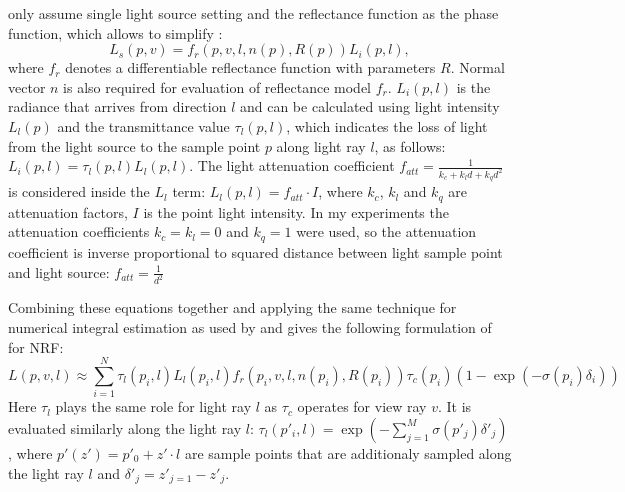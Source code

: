 \cite{bi2020neural} only assume single light source setting
and the reflectance function as the phase function,
which allows to simplify :
\begin{equation}
    L_s(p, v) = f_r(p, v, l, n(p), R(p)) L_i(p, l),
\end{equation}
where $f_r$ denotes a differentiable reflectance function
with parameters $R$.
Normal vector $n$ is also required for evaluation of reflectance model $f_r$.
$L_i(p, l)$ is the radiance that arrives from direction $l$ and can be calculated using light intensity $L_l(p)$
and the transmittance value $\tau_l(p, l)$,
which indicates the loss of light from the light source to the sample point $p$ along light ray $l$, as follows:
$L_i(p, l) = \tau_l(p, l) L_l(p, l)$.
The light attenuation coefficient $f_{att} = \frac{1}{k_c + k_l d + k_q d^2}$ \cite{madams2011attenuation, madams2011improved} is considered inside the $L_l$ term:
$L_l(p, l) = f_{att} \cdot I$,
where $k_c$, $k_l$ and $k_q$ are attenuation factors,
$I$ is the point light intensity.
In my experiments the attenuation coefficients $k_c = k_l = 0$ and $k_q = 1$ were used,
so the attenuation coefficient is inverse proportional to squared distance between light sample point and light source:
$f_{att} = \frac{1}{d^2}$

Combining these equations together and applying the same technique for numerical integral estimation
as used by \cite{mildenhall2020nerf} and \cite{liu2021neural} gives the following formulation of  for NRF:
\begin{equation}
    \label{eq:integral_estimation_nrf}
    L(p, v, l) \approx \sum_{i=1}^N \tau_l(p_i, l) L_l(p_i, l) f_r(p_i, v, l, n(p_i), R(p_i)) \tau_c(p_i) (1 - \exp (-\sigma(p_i)\delta_i))
\end{equation}
Here $\tau_l$ plays the same role for light ray $l$
as $\tau_c$ operates for view ray $v$.
It is evaluated similarly along the light ray $l$:
$\tau_l(p'_i, l) = \exp (-\sum_{j=1}^M \sigma(p'_j) \delta'_j)$,
where $p'(z') = p'_0 + z' \cdot l$ are sample points that are additionaly sampled along the light ray $l$ and $\delta'_j = z'_{j=1} - z'_j$.



